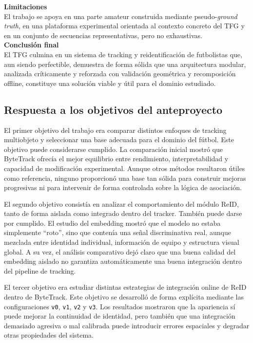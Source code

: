 \documentclass[../MAIN.tex]{subfiles}
\begin{document}
\begin{chaptertemplatebox}
		\textbf{Limitaciones}\\
		El trabajo se apoya en una parte amateur construida mediante pseudo-\textit{ground truth}, en una plataforma experimental orientada al contexto concreto del TFG y en un conjunto de secuencias representativas, pero no exhaustivas.\\[0.5em]
		
		\textbf{Conclusión final}\\
		El TFG culmina en un sistema de tracking y reidentificación de futbolistas que, aun siendo perfectible, demuestra de forma sólida que una arquitectura modular, analizada críticamente y reforzada con validación geométrica y recomposición offline, constituye una solución viable y útil para el dominio estudiado.
	\end{chaptertemplatebox}
	
	\subsection{Respuesta a los objetivos del anteproyecto}
	
	El primer objetivo del trabajo era comparar distintos enfoques de tracking multiobjeto y seleccionar una base adecuada para el dominio del fútbol. Este objetivo puede considerarse cumplido. La comparación inicial mostró que ByteTrack ofrecía el mejor equilibrio entre rendimiento, interpretabilidad y capacidad de modificación experimental. Aunque otros métodos resultaron útiles como referencia, ninguno proporcionó una base tan sólida para construir mejoras progresivas ni para intervenir de forma controlada sobre la lógica de asociación.
	
	El segundo objetivo consistía en analizar el comportamiento del módulo ReID, tanto de forma aislada como integrado dentro del tracker. También puede darse por cumplido. El estudio del embedding mostró que el modelo no estaba simplemente “roto”, sino que contenía una señal discriminativa real, aunque mezclada entre identidad individual, información de equipo y estructura visual global. A su vez, el análisis comparativo dejó claro que una buena calidad del embedding aislado no garantiza automáticamente una buena integración dentro del pipeline de tracking.
	
	El tercer objetivo era estudiar distintas estrategias de integración online de ReID dentro de ByteTrack. Este objetivo se desarrolló de forma explícita mediante las configuraciones \texttt{v0}, \texttt{v1}, \texttt{v2} y \texttt{v3}. Los resultados mostraron que la apariencia sí puede mejorar la continuidad de identidad, pero también que una integración demasiado agresiva o mal calibrada puede introducir errores espaciales y degradar otras propiedades del sistema.
	
\end{document}
